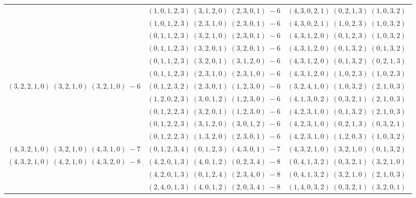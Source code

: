 \documentclass[11pt]{article}
\begin{document}
\begin{longtable}[l]{|c|c|c|}
 \cline{2-3} 
 & $(1 ,0 ,1 ,2 ,3) \;(3 ,1 ,2 ,0) \;(2 ,3 ,0 ,1) \;-6$ & $(4 ,3 ,0 ,2 ,1) \;(0 ,2 ,1 ,3) \;(1 ,0 ,3 ,2) \;$\\ 
 \cline{2-3} 
 & $(1 ,0 ,1 ,2 ,3) \;(2 ,3 ,1 ,0) \;(2 ,3 ,0 ,1) \;-6$ & $(4 ,3 ,0 ,2 ,1) \;(1 ,0 ,2 ,3) \;(1 ,0 ,3 ,2) \;$\\ 
 \cline{2-3} 
 & $(0 ,1 ,1 ,2 ,3) \;(3 ,2 ,1 ,0) \;(2 ,3 ,0 ,1) \;-6$ & $(4 ,3 ,1 ,2 ,0) \;(0 ,1 ,2 ,3) \;(1 ,0 ,3 ,2) \;$\\ 
 \cline{2-3} 
 & $(0 ,1 ,1 ,2 ,3) \;(3 ,2 ,0 ,1) \;(3 ,2 ,0 ,1) \;-6$ & $(4 ,3 ,1 ,2 ,0) \;(0 ,1 ,3 ,2) \;(0 ,1 ,3 ,2) \;$\\ 
 \cline{2-3} 
 & $(0 ,1 ,1 ,2 ,3) \;(3 ,2 ,0 ,1) \;(3 ,1 ,2 ,0) \;-6$ & $(4 ,3 ,1 ,2 ,0) \;(0 ,1 ,3 ,2) \;(0 ,2 ,1 ,3) \;$\\ 
 \cline{2-3} 
 & $(0 ,1 ,1 ,2 ,3) \;(2 ,3 ,1 ,0) \;(2 ,3 ,1 ,0) \;-6$ & $(4 ,3 ,1 ,2 ,0) \;(1 ,0 ,2 ,3) \;(1 ,0 ,2 ,3) \;$\\ \hline\multirow[t]{5}{*}{ $(3 ,2 ,2 ,1 ,0) \;(3 ,2 ,1 ,0) \;(3 ,2 ,1 ,0) \;-6$ }  & $(0 ,1 ,2 ,3 ,2) \;(2 ,3 ,0 ,1) \;(1 ,2 ,3 ,0) \;-6$ & $(3 ,2 ,4 ,1 ,0) \;(1 ,0 ,3 ,2) \;(2 ,1 ,0 ,3) \;$\\ 
 \cline{2-3} 
 & $(1 ,2 ,0 ,2 ,3) \;(3 ,0 ,1 ,2) \;(1 ,2 ,3 ,0) \;-6$ & $(4 ,1 ,3 ,0 ,2) \;(0 ,3 ,2 ,1) \;(2 ,1 ,0 ,3) \;$\\ 
 \cline{2-3} 
 & $(0 ,1 ,2 ,2 ,3) \;(3 ,2 ,0 ,1) \;(1 ,2 ,3 ,0) \;-6$ & $(4 ,2 ,3 ,1 ,0) \;(0 ,1 ,3 ,2) \;(2 ,1 ,0 ,3) \;$\\ 
 \cline{2-3} 
 & $(0 ,1 ,2 ,2 ,3) \;(3 ,1 ,2 ,0) \;(3 ,0 ,1 ,2) \;-6$ & $(4 ,2 ,3 ,1 ,0) \;(0 ,2 ,1 ,3) \;(0 ,3 ,2 ,1) \;$\\ 
 \cline{2-3} 
 & $(0 ,1 ,2 ,2 ,3) \;(1 ,3 ,2 ,0) \;(2 ,3 ,0 ,1) \;-6$ & $(4 ,2 ,3 ,1 ,0) \;(1 ,2 ,0 ,3) \;(1 ,0 ,3 ,2) \;$\\ \hline\multirow[t]{1}{*}{ $(4 ,3 ,2 ,1 ,0) \;(3 ,2 ,1 ,0) \;(4 ,3 ,1 ,0) \;-7$ }  & $(0 ,1 ,2 ,3 ,4) \;(0 ,1 ,2 ,3) \;(4 ,3 ,0 ,1) \;-7$ & $(4 ,3 ,2 ,1 ,0) \;(3 ,2 ,1 ,0) \;(0 ,1 ,3 ,2) \;$\\ \hline\multirow[t]{39}{*}{ $(4 ,3 ,2 ,1 ,0) \;(4 ,2 ,1 ,0) \;(4 ,3 ,2 ,0) \;-8$ }  & $(4 ,2 ,0 ,1 ,3) \;(4 ,0 ,1 ,2) \;(0 ,2 ,3 ,4) \;-8$ & $(0 ,4 ,1 ,3 ,2) \;(0 ,3 ,2 ,1) \;(3 ,2 ,1 ,0) \;$\\ 
 \cline{2-3} 
 & $(4 ,2 ,0 ,1 ,3) \;(0 ,1 ,2 ,4) \;(2 ,3 ,4 ,0) \;-8$ & $(0 ,4 ,1 ,3 ,2) \;(3 ,2 ,1 ,0) \;(2 ,1 ,0 ,3) \;$\\ 
 \cline{2-3} 
 & $(2 ,4 ,0 ,1 ,3) \;(4 ,0 ,1 ,2) \;(2 ,0 ,3 ,4) \;-8$ & $(1 ,4 ,0 ,3 ,2) \;(0 ,3 ,2 ,1) \;(3 ,2 ,0 ,1) \;$\\ 

\end{longtable}
\end{document}
